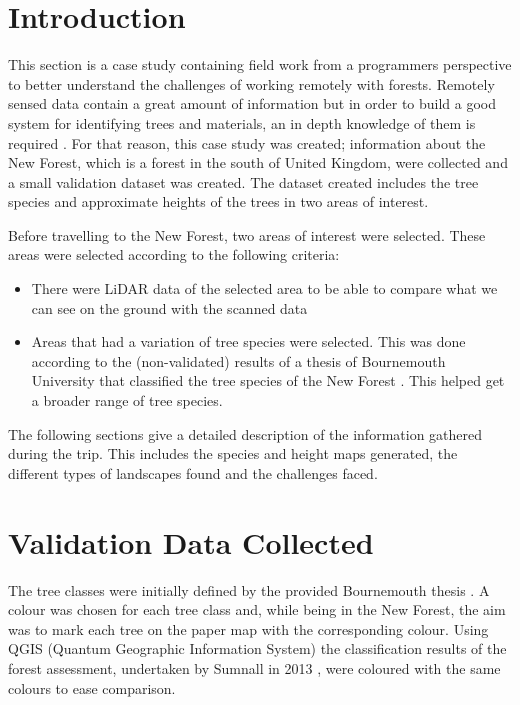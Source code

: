 \documentclass{subfiles}
\begin{document}
	\section{Introduction}
	\par This section is a case study containing field work from a {\color{blue} programmers perspective} to better understand the challenges of working remotely with forests. Remotely sensed data contain a great amount of information but in order to build a good system for identifying trees and materials, an in depth knowledge of them is required \cite{Smith2012}. For that reason, this case study was created; information about the New Forest, which is a forest in the south of United Kingdom, were collected and a small validation dataset was created. The dataset created includes the tree species and approximate heights of the trees in two areas of interest. 
	

	\par Before travelling to the New Forest, two areas of interest were selected. These areas were selected according to the following criteria:
	\begin{itemize}
		\item There were LiDAR data of the selected area to be able to compare what we can see on the ground with the scanned data
		\item Areas that had a variation of tree species were selected. This was done according to the (non-validated) results of a thesis of Bournemouth University that classified the tree species of the New Forest \cite{Sumnall2013}. This helped get a broader range of tree species. 
	\end{itemize}
	
	\par The following sections give a detailed description of the information gathered during the trip. This includes the species and height maps generated, the different types of landscapes found and the challenges faced. 
		
	
	   \section{Validation Data Collected}
	   \par The tree classes were initially defined by the provided Bournemouth thesis \cite{Sumnall2013}. A colour was chosen for each tree class and, while being in the New Forest, the aim was to mark each tree on the paper map with the corresponding colour. Using QGIS (Quantum Geographic Information System) the classification results of the forest assessment, undertaken by Sumnall in 2013 \cite{Sumnall2013}, were coloured with the same colours to ease comparison.
	   
\end{document}
